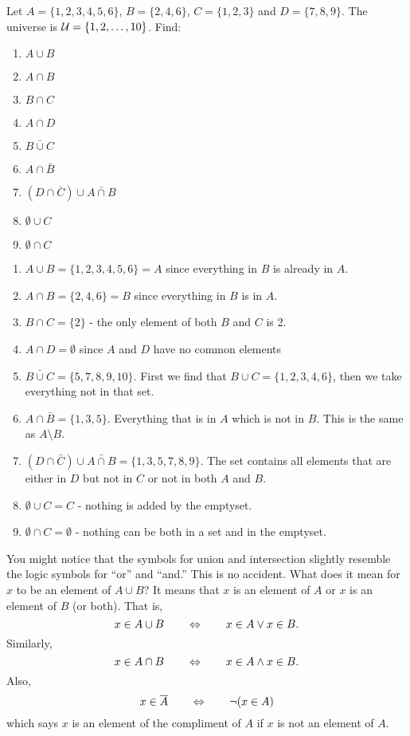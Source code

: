 \documentclass[12pt]{article}
\begin{document}
\begin{example}
 Let $A = \{1, 2, 3, 4, 5, 6\}$, $B = \{2, 4, 6\}$, $C = \{1, 2, 3\}$ and $D = \{7, 8, 9\}$.  The universe is $\mathcal U = \{1, 2, \ldots, 10\}$.  Find:
\begin{multicols}{3}
 \begin{enumerate}
  \item $A \cup B$
\item $A \cap B$
\item $B \cap C$
\item $A \cap D$
\item $\bar{B \cup C}$
\item $A \cap \bar B$
\item $(D \cap \bar C) \cup \bar{A \cap B}$
\item $\emptyset \cup C$
\item $\emptyset \cap C$
 \end{enumerate}
\end{multicols}
\begin{solution}
  \begin{enumerate}
  \item $A \cup B = \{1, 2, 3, 4, 5, 6\} = A$ since everything in $B$ is already in $A$.
\item $A \cap B = \{2, 4, 6\} = B$ since everything in $B$ is in $A$.
\item $B \cap C = \{2\}$ - the only element of both $B$ and $C$ is 2.
\item $A \cap D = \emptyset$ since $A$ and $D$ have no common elements
\item $\bar{B \cup C} = \{5, 7, 8, 9, 10\}$.  First we find that $B \cup C = \{1, 2, 3, 4, 6\}$, then we take everything not in that set.
\item $A \cap \bar B = \{1, 3, 5\}$.  Everything that is in $A$ which is not in $B$.  This is the same as $A \setminus B$.
\item $(D \cap \bar C) \cup \bar{A \cap B} = \{1, 3, 5, 7, 8, 9\}.$ The set contains all elements that are either in $D$ but not in $C$ or not in both $A$ and $B$.
\item $\emptyset \cup C = C$ - nothing is added by the emptyset.
\item $\emptyset \cap C = \emptyset$ - nothing can be both in a set and in the emptyset.
 \end{enumerate}
\end{solution}
\end{example}

You might notice that the symbols for union and intersection slightly resemble the logic symbols for ``or'' and ``and.''  This is no accident.  What does it mean for $x$ to be an element of $A\cup B$?  It means that $x$ is an element of $A$ or $x$ is an element of $B$ (or both).  That is,
\[x \in A \cup B \qquad \Leftrightarrow \qquad x \in A \vee x \in B.\]
Similarly,
\[x \in A \cap B \qquad \Leftrightarrow \qquad x \in A \wedge x \in B.\]
Also,
\[x \in \overline A \qquad \Leftrightarrow \qquad \neg (x \in  A)\]
which says $x$ is an element of the compliment of $A$ if $x$ is not an element of $A$.
\end{document}
